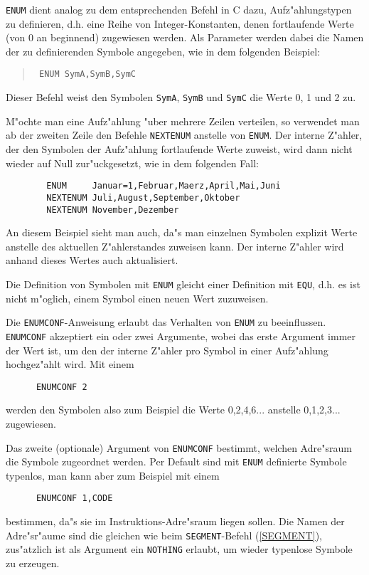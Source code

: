 \documentclass[12pt,a4paper,twoside]{report}
\newcommand{\tty}[1]{{\tt #1}}
\begin{document}
\tty{ENUM} dient analog zu dem entsprechenden Befehl in C dazu,
Aufz"ahlungstypen zu definieren, d.h. eine Reihe von Integer-Konstanten,
denen fortlaufende Werte (von 0 an beginnend) zugewiesen
werden. Als Parameter werden dabei die Namen der zu definierenden
Symbole angegeben, wie in dem folgenden Beispiel:
\begin{quote}{\tt
        ENUM    SymA,SymB,SymC}
\end{quote}
Dieser Befehl weist den Symbolen \tty{SymA}, \tty{SymB} und \tty{SymC}
die Werte 0, 1 und 2 zu.
\par
M"ochte man eine Aufz"ahlung "uber mehrere Zeilen verteilen, so
verwendet man ab der zweiten Zeile den Befehle \tty{NEXTENUM}
anstelle von \tty{ENUM}.  Der interne Z"ahler, der den Symbolen
der Aufz"ahlung fortlaufende Werte zuweist, wird dann nicht
wieder auf Null zur"uckgesetzt, wie in dem folgenden Fall:
\begin{verbatim}
        ENUM     Januar=1,Februar,Maerz,April,Mai,Juni
        NEXTENUM Juli,August,September,Oktober
        NEXTENUM November,Dezember
\end{verbatim}
An diesem Beispiel sieht man auch, da"s man einzelnen Symbolen
explizit Werte anstelle des aktuellen Z"ahlerstandes zuweisen
kann.  Der interne Z"ahler wird anhand dieses Wertes auch
aktualisiert.

Die Definition von Symbolen mit \tty{ENUM} gleicht einer Definition
mit \tty{EQU}, d.h. es ist nicht m"oglich, einem Symbol einen neuen
Wert zuzuweisen.

Die \tty{ENUMCONF}-Anweisung erlaubt das Verhalten von \tty{ENUM}
zu beeinflussen.  \tty{ENUMCONF} akzeptiert ein oder zwei
Argumente, wobei das erste Argument immer der Wert ist, um den
der interne Z"ahler pro Symbol in einer Aufz"ahlung hochgez"ahlt
wird.  Mit einem
\begin{verbatim}
      ENUMCONF 2
\end{verbatim}
werden den Symbolen also zum Beispiel die Werte 0,2,4,6...
anstelle 0,1,2,3... zugewiesen.

Das zweite (optionale) Argument von \tty{ENUMCONF} bestimmt,
welchen Adre"sraum die Symbole zugeordnet werden.  Per Default
sind mit \tty{ENUM} definierte Symbole typenlos, man kann aber
zum Beispiel mit einem
\begin{verbatim}
      ENUMCONF 1,CODE
\end{verbatim}  
bestimmen, da"s sie im Instruktions-Adre"sraum liegen sollen.  Die
Namen der Adre"sr"aume sind die gleichen wie beim
\tty{SEGMENT}-Befehl (\ref{SEGMENT}), zus"atzlich ist als
Argument ein \tty{NOTHING} erlaubt, um wieder typenlose Symbole
zu erzeugen.
\end{document}
